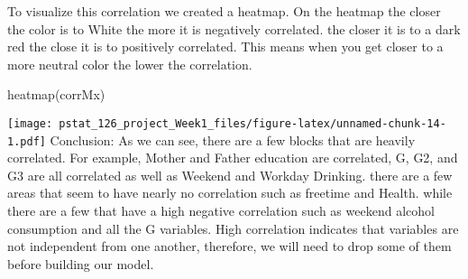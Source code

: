 \documentclass[
]{article}
\newenvironment{Shaded}{\begin{snugshade}}{\end{snugshade}}
\newcommand{\FunctionTok}[1]{\textcolor[rgb]{0.00,0.00,0.00}{#1}}
\newcommand{\NormalTok}[1]{#1}
\begin{document}
To visualize this correlation we created a heatmap. On the heatmap the
closer the color is to White the more it is negatively correlated. the
closer it is to a dark red the close it is to positively correlated.
This means when you get closer to a more neutral color the lower the
correlation.

\begin{Shaded}
\begin{Highlighting}[]
\FunctionTok{heatmap}\NormalTok{(corrMx)}
\end{Highlighting}
\end{Shaded}

\texttt{[image: pstat\_126\_project\_Week1\_files/figure-latex/unnamed-chunk-14-1.pdf]}
Conclusion: As we can see, there are a few blocks that are heavily
correlated. For example, Mother and Father education are correlated, G,
G2, and G3 are all correlated as well as Weekend and Workday Drinking.
there are a few areas that seem to have nearly no correlation such as
freetime and Health. while there are a few that have a high negative
correlation such as weekend alcohol consumption and all the G variables.
High correlation indicates that variables are not independent from one
another, therefore, we will need to drop some of them before building
our model.
\end{document}
